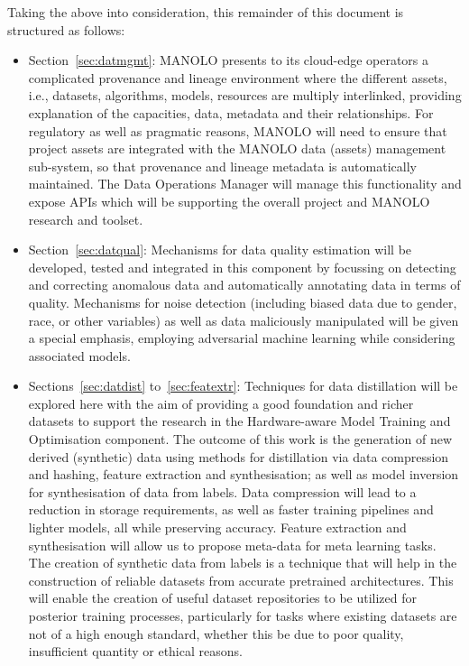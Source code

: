 \documentclass{manolo}
\begin{document}
Taking the above into consideration, this remainder of this document
is structured as follows:
%
\begin{itemize}
\item Section~\ref{sec:datmgmt}: MANOLO presents to its cloud-edge operators
  a complicated provenance and lineage environment where the different
  assets, i.e., datasets, algorithms, models, resources are multiply
  interlinked, providing explanation of the capacities, data, metadata
  and their relationships. For regulatory as well as pragmatic
  reasons, MANOLO will need to ensure that project assets are
  integrated with the MANOLO data (assets) management sub-system, so
  that provenance and lineage metadata is automatically maintained.
  The Data Operations Manager will manage this functionality and
  expose APIs which will be supporting the overall project and MANOLO
  research and toolset.
\item Section~\ref{sec:datqual}: Mechanisms for data quality estimation will
  be developed, tested and integrated in this component by focussing
  on detecting and correcting anomalous data and automatically
  annotating data in terms of quality. Mechanisms for noise detection
  (including biased data due to gender, race, or other variables) as
  well as data maliciously manipulated will be given a special
  emphasis, employing adversarial machine learning while considering
  associated models.
\item Sections~\ref{sec:datdist} to~\ref{sec:featextr}:
  Techniques for data distillation will be explored here with the aim
  of providing a good foundation and richer datasets to support the
  research in the Hardware-aware Model Training and Optimisation
  component. The outcome of this work is the generation of new derived
  (synthetic) data using methods for distillation via data compression
  and hashing, feature extraction and synthesisation; as well as model
  inversion for synthesisation of data from labels. Data compression
  will lead to a reduction in storage requirements, as well as faster
  training pipelines and lighter models, all while preserving
  accuracy. Feature extraction and synthesisation will allow us to
  propose meta-data for meta learning tasks. The creation of synthetic
  data from labels is a technique that will help in the construction
  of reliable datasets from accurate pretrained architectures. This
  will enable the creation of useful dataset repositories to be
  utilized for posterior training processes, particularly for tasks
  where existing datasets are not of a high enough standard, whether
  this be due to poor quality, insufficient quantity or ethical
  reasons.
\end{itemize}
\end{document}
